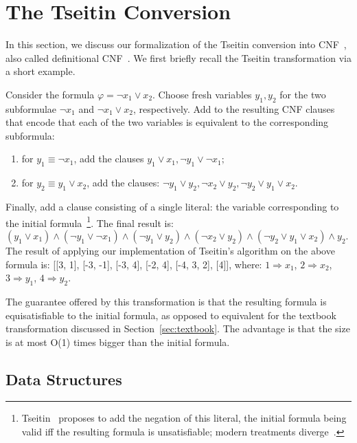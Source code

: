 \chapter{The Tseitin Conversion}

In this section, we discuss our formalization of the Tseitin
conversion into CNF~\cite{Tseitin}, also called definitional
CNF~\cite{harrison}. We first briefly recall the Tseitin
transformation via a short example.



  Consider the formula \( \varphi = \lnot x_1 \lor x_2 \). Choose
  fresh variables \( y_1, y_2 \) for the two subformulae
  \( \lnot x_1 \) and \( \lnot x_1 \lor x_2 \), respectively. Add to
  the resulting CNF clauses that encode that each of the two variables
  is equivalent to the corresponding subformula:

  \begin{enumerate}
  \item for \( y_1 \equiv \lnot x_1 \), add the clauses
    $ y_1 \lor x_1, \lnot y_1 \lor \lnot x_1 ;$
  \item for \( y_2 \equiv y_1 \lor x_2 \), add the clauses:
    $ \lnot y_1 \lor y_2, \lnot x_2 \lor y_2, \lnot y_2
      \lor y_1 \lor x_2 .$
  \end{enumerate}

  Finally, add a clause consisting of a single literal: the variable
  corresponding to the initial
  formula~\footnote{Tseitin~\cite{Tseitin} proposes to add the
    negation of this literal, the initial formula being valid iff the
    resulting formula is unsatisfiable; modern treatments
    diverge~\cite{harrison}.}. The final result is:
  \((y_1 \lor x_1) \land (\lnot y_1 \lor \lnot x_1) \land (\lnot y_1
  \lor y_2) \land (\lnot x_2 \lor y_2) \land (\lnot y_2 \lor y_1 \lor
  x_2) \land y_2.\)
  The result of applying our implementation of Tseitin's algorithm 
  on the above formula is:
  [[3, 1], [-3, -1], [-3, 4], [-2, 4], [-4, 3, 2], [4]], 
  where: \( 1 \Rightarrow x_1 \), \( 2 \Rightarrow x_2 \), 
  \( 3 \Rightarrow y_1 \), \( 4 \Rightarrow y_2 \).



The guarantee offered by this transformation is that the resulting
formula is equisatisfiable to the initial formula, as opposed to
equivalent for the textbook transformation discussed in
Section~\ref{sec:textbook}. The advantage is that the size is at most
O(1) times bigger than the initial formula.

\section{Data Structures}

